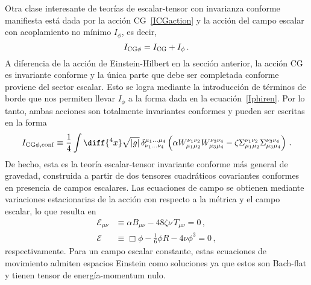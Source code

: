 \documentclass[../Main.tex]{subfiles}
\begin{document}
Otra clase interesante de teorías de escalar-tensor con invarianza conforme manifiesta está dada por la acción CG~\eqref{ICGaction} y la acción del campo escalar con acoplamiento no mínimo $I_{\phi}$, es decir,
\begin{equation}
I_{\rm CG\phi} = I_{\rm CG} + I_{\phi} \, .
\label{ICGphi}
\end{equation}
A diferencia de la acción de Einstein-Hilbert en la sección anterior, la acción CG es invariante conforme y la única parte que debe ser completada conforme proviene del sector escalar. Esto se logra mediante la introducción de términos de borde que nos permiten llevar $I_{\phi}$ a la forma dada en la ecuación~\eqref{Iphiren}. Por lo tanto, ambas acciones son totalmente invariantes conformes y pueden ser escritas en la forma
\begin{equation}
I_{\rm CG\phi,conf}   \equiv \frac{1}{4}\int\diff{^4x}\sqrt{|g|}\,\delta^{\mu_1\ldots\mu_4}_{\nu_1\ldots\nu_4}\left(\alpha W^{\nu_1\nu_2}_{\mu_1\mu_2}W^{\nu_3\nu_4}_{\mu_3\mu_4} - \zeta\Sigma^{\nu_1\nu_2}_{\mu_1\mu_2}\Sigma^{\nu_3\nu_4}_{\mu_3\mu_4}\right)  \,.\label{Lagconformal}
\end{equation}
De hecho, esta es la teoría escalar-tensor invariante conforme más general de gravedad, construida a partir de dos tensores cuadráticos covariantes conformes en presencia de campos escalares.
Las ecuaciones de campo se obtienen mediante variaciones estacionarias de la acción con respecto a la métrica y el campo escalar, lo que resulta en
\begin{subequations}\label{eom}
\begin{align}\label{eomg}
    \mathcal{E}_{\mu\nu} &\equiv \alpha B_{\mu\nu} - 48\zeta\nu\, T_{\mu\nu} = 0\,, \\
    \label{eomp}
    \mathcal{E} &\equiv \Box\phi - \frac{1}{6}\phi R - 4\nu\phi^3 = 0\,, 
\end{align}
\end{subequations}
respectivamente. Para un campo escalar constante, estas ecuaciones de movimiento admiten espacios Einstein como soluciones ya que estos son Bach-flat y tienen tensor de energía-momentum nulo. 
\end{document}
